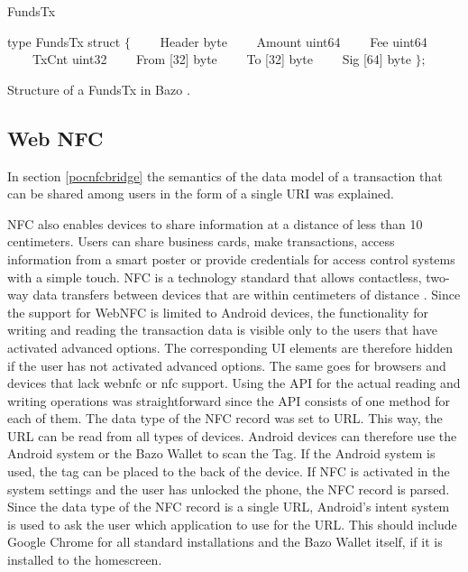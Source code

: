 \begin{algorithm}
\caption{FundsTx}
\label{euclid}
\begin{algorithmic}[1]
\State type FundsTx struct $\{$
\State \ \ \ \ Header byte
\State \ \ \ \ Amount uint64
\State \ \ \ \ Fee uint64
\State \ \ \ \ TxCnt uint32
\State \ \ \ \ From [32] byte
\State \ \ \ \ To [32] byte
\State \ \ \ \ Sig [64] byte
\State  $\};$
\end{algorithmic}
\end{algorithm}\label{fig:FundsTX}Structure of a FundsTx in Bazo \cite{lisg}.


\subsection{Web NFC}
In section \ref{pocnfcbridge} the semantics of the data model of a transaction that can be shared among users in the form of a single URI was explained.

NFC also enables devices to share information at a distance of less than 10 centimeters. Users can share business cards, make transactions, access information from a smart poster or provide credentials for access control systems with a simple touch.
NFC is a technology standard that allows contactless, two-way data transfers between devices that are within centimeters of distance \cite{nfcforum}.
Since the support for WebNFC is limited to Android devices, the functionality for writing and reading the transaction data is visible only to the users that have activated advanced options.
The corresponding UI elements are therefore hidden if the user has not activated advanced options. The same goes for browsers and devices that lack webnfc or nfc support.
Using the API for the actual reading and writing operations was straightforward since the API consists of one method for each of them. The data type of the NFC record was set to URL.
This way, the URL can be read from all types of devices. Android devices can therefore use the Android system or the Bazo Wallet to scan the Tag. If the Android system is used, the tag can be placed to the back of the device. If NFC is activated in the system settings and the user has unlocked the phone, the NFC record is parsed. Since the data type of the NFC record is a single URL, Android's intent system is used to ask the user which application to use for the URL. This should include Google Chrome for all standard installations and the Bazo Wallet itself, if it is installed to the homescreen.


